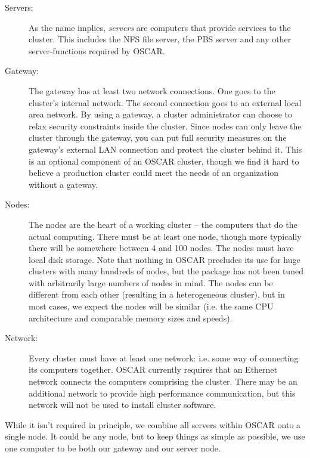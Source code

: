 \documentclass[letterpaper,11pt]{article}
\begin{document}
\begin{description}
        \item[Servers:] As the name implies, \emph{servers} are computers
        that provide services to the cluster.  This includes the NFS file
        server, the PBS server and any other server-functions required by
        OSCAR.

        \item[Gateway:] The gateway has at least two network connections.
        One goes to the cluster's internal network.  The second connection
        goes to an external local area network.  By using a gateway, a
        cluster administrator can choose to relax security constraints
        inside the cluster.  Since nodes can only leave the cluster
        through the gateway, you can put full security measures on the
        gateway's external LAN connection and protect the cluster behind
        it.  This is an optional component of an OSCAR cluster, though we
        find it hard to believe a production cluster could meet the needs
        of an organization without a gateway.

        \item[Nodes:] The nodes are the heart of a working cluster -- the
        computers that do the actual computing.  There must be at least
        one node, though more typically there will be somewhere between 4
        and 100 nodes.  The nodes must have local disk storage.  Note that
        nothing in OSCAR precludes its use for huge clusters with many
        hundreds of nodes, but the package has not been tuned with
        arbitrarily large numbers of nodes in mind.  The nodes can be
        different from each other (resulting in a heterogeneous cluster),
        but in most cases, we expect the nodes will be similar (i.e. the
        same CPU architecture and comparable memory sizes and speeds).

        \item[Network:] Every cluster must have at least one network: i.e.
        some way of connecting its computers together.  OSCAR currently
        requires that an Ethernet network connects the computers
        comprising the cluster.  There may be an additional network to
        provide high performance communication, but this network will not
        be used to install cluster software.

\end{description}

While it isn't required in principle, we combine all servers within
OSCAR onto a single node.  It could be any node, but to keep things as
simple as possible, we use one computer to be both our gateway and our
server node.
\end{document}
